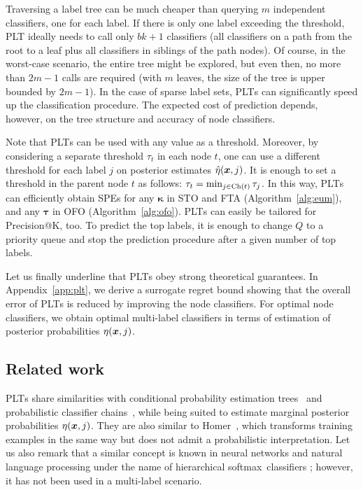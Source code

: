 \documentclass{article}
\newcommand{\btau}{\boldsymbol{\tau}}
\newcommand{\bkappa}{\boldsymbol{\kappa}}
\newcommand{\Algo}[1]{\textsc{#1}}
\newcommand{\sectionBefore}{-0pt}
\newcommand{\sectionAfter}{-0pt}
\begin{document}
Traversing a label tree can be much cheaper than querying $m$ independent classifiers, one for each label. If there is only one label exceeding the threshold, \Algo{PLT} ideally needs to call only $bk+1$ classifiers (all classifiers on a path from the root to a leaf plus all classifiers in siblings of the path nodes). Of course, in the worst-case scenario, the entire tree might be explored, but even then, no more than $2m-1$ calls are required (with $m$ leaves, the size of the tree is upper bounded by $2m-1$). In the case of sparse label sets, \Algo{PLT}s can significantly speed up the classification procedure. The expected cost of prediction depends, however, on the tree structure and accuracy of node classifiers.


Note that \Algo{PLT}s can be used with any value as a threshold. Moreover, by considering a separate threshold $\tau_t$ in each node $t$, one can use a different threshold for each label $j$ on posterior estimates $\hat\eta(\boldsymbol{x},j)$. It is enough to set a threshold in the parent node $t$ as follows:
$\tau_t = \min_{j \in \mathrm{Ch}(t)} \tau_j$. 
In this way, \Algo{PLT}s  can efficiently obtain SPEs for any $\bkappa$ in \Algo{STO} and \Algo{FTA} (Algorithm~\ref{alg:eum}), and any $\btau$ in \Algo{OFO} (Algorithm~\ref{alg:ofo}). 
%
\Algo{PLT}s can easily be tailored for Precision@K, too. To predict the top labels, it is enough to change $Q$ to a priority queue and stop the prediction procedure after a given number of top labels. %

Let us finally underline that  \Algo{PLT}s obey strong theoretical guarantees. In  Appendix~\ref{app:plt}, we derive a surrogate regret bound showing that the overall error of \Algo{PLT}s is reduced by improving the node classifiers. For optimal node classifiers, we obtain optimal multi-label classifiers in terms of estimation of posterior probabilities $\eta(\boldsymbol{x},j)$.



\vspace{\sectionBefore}
\subsection{Related work}
\vspace{\sectionAfter}

\Algo{PLT}s share similarities with conditional probability estimation trees~\cite{Beygelzimer_et_al_2009b} and probabilistic classifier chains~\cite{Dembczynski_et_al_2010c}, while being suited to estimate marginal posterior probabilities $\eta(\boldsymbol{x},j)$. They are also similar to Homer~\cite{Tsoumakas_et_al_2008}, which transforms training examples in the same way but does not admit a probabilistic interpretation. Let us also remark that a similar concept is known in neural networks and natural language processing under the name of hierarchical softmax~classifiers \cite{Morin_Bengio_2005}; however, it has not been used in a multi-label scenario.
\end{document}
